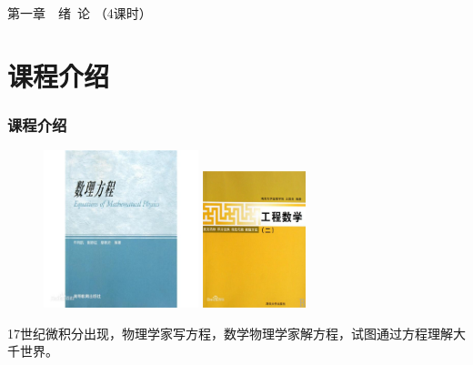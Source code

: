 	\begin{frame}
		\frametitle{}
		\Background[1] 
	    \begin{center}
		{ {\Huge 第一章~~绪~论 （4课时）}}
	    \end{center}    
		\addtocounter{framenumber}{-1} 
	\end{frame}



\section{课程介绍}

\begin{frame}
\frametitle{课程介绍}
	\begin{center}
		\begin{figure}
		\begin{minipage}[t]{0.4\textwidth}
			\includegraphics[width=4.5cm]{figs/fig1-2.png}	
		\end{minipage}
		\begin{minipage}[t]{0.4\textwidth}
			\includegraphics[width=3.0cm]{figs/fig1-2-2.png}	
		\end{minipage}
		\end{figure}
	17世纪微积分出现，物理学家写方程，数学物理学家解方程，试图通过方程理解大千世界。
  	\end{center}
\end{frame}

